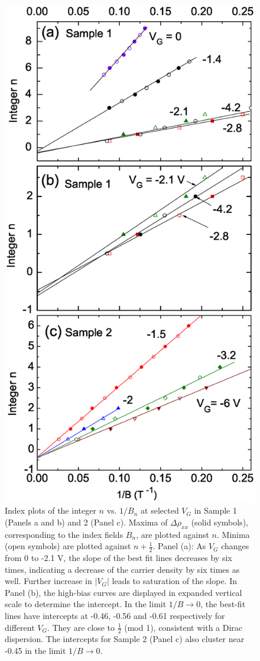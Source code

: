 \begin{figure}[!htbp]
  \begin{center}
\includegraphics[width=0.85\linewidth]{ch-liquid/figures/FigIndexAll}
\caption{\label{figIndex} 
Index plots of the integer $n$ vs. $1/B_n$ at selected $V_G$ in Sample 1 (Panels a and b) and 2 (Panel c).
Maxima of $\Delta\rho_{xx}$ (solid symbols), corresponding to the index fields $B_n$, are plotted against $n$. Minima (open symbols)
are plotted against $n+\frac12$.
Panel (a): As $V_G$ changes from 0 to -2.1 V, the slope of the best fit lines decreases by six times, indicating a decrease of the carrier density by six times as well. Further increase
in $|V_G|$ leads to saturation of the slope. In Panel (b), the high-bias curves are displayed in expanded vertical scale to determine the intercept. In the limit $1/B\to 0$, the best-fit lines have intercepts at -0.46, -0.56 and -0.61 respectively for different $V_G$. They are close to $\frac12$ (mod 1), consistent with a Dirac dispersion.
The intercepts for Sample 2 (Panel c) also cluster near -0.45 in the limit $1/B\to 0$.
}
  \end{center}
\end{figure} 


